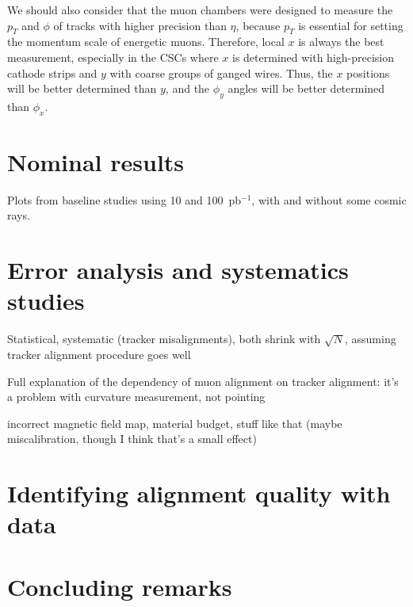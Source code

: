 \documentclass[12pt]{article}
\begin{document}
We should also consider that the muon chambers were designed to
measure the $p_T$ and $\phi$ of tracks with higher precision than
$\eta$, because $p_T$ is essential for setting the momentum scale of
energetic muons.  Therefore, local $x$ is always the best measurement,
especially in the CSCs where $x$ is determined with high-precision
cathode strips and $y$ with coarse groups of ganged wires.  Thus, the
$x$ positions will be better determined than $y$, and the $\phi_y$
angles will be better determined than $\phi_x$.

\section{Nominal results}

Plots from baseline studies using 10 and 100~pb$^{-1}$, with and
without some cosmic rays.  




\section{Error analysis and systematics studies}

Statistical, systematic (tracker misalignments), both shrink with
$\sqrt{N}$, assuming tracker alignment procedure goes well

Full explanation of the dependency of muon alignment on tracker
alignment: it's a problem with curvature measurement, not pointing

incorrect magnetic field map, material budget, stuff like that (maybe
miscalibration, though I think that's a small effect)


\section{Identifying alignment quality with data}

\section{Concluding remarks}




\end{document}
